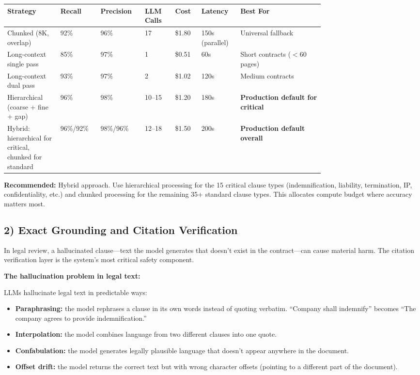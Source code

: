 \begin{tabular}{|p{0.14\linewidth}|p{0.08\linewidth}|p{0.10\linewidth}|p{0.08\linewidth}|p{0.06\linewidth}|p{0.08\linewidth}|p{0.22\linewidth}|}
\hline
\textbf{Strategy} & \textbf{Recall} & \textbf{Precision} & \textbf{LLM Calls} & \textbf{Cost} & \textbf{Latency} & \textbf{Best For} \\
\hline
Chunked (8K, overlap) & 92\% & 96\% & 17 & \$1.80 & 150s (parallel) & Universal fallback \\
\hline
Long-context single pass & 85\% & 97\% & 1 & \$0.51 & 60s & Short contracts ($<$60 pages) \\
\hline
Long-context dual pass & 93\% & 97\% & 2 & \$1.02 & 120s & Medium contracts \\
\hline
Hierarchical (coarse + fine + gap) & 96\% & 98\% & 10--15 & \$1.20 & 180s & \textbf{Production default for critical} \\
\hline
Hybrid: hierarchical for critical, chunked for standard & 96\%/92\% & 98\%/96\% & 12--18 & \$1.50 & 200s & \textbf{Production default overall} \\
\hline
\end{tabular}

\textbf{Recommended:} Hybrid approach. Use hierarchical processing for the 15 critical clause types (indemnification, liability, termination, IP, confidentiality, etc.) and chunked processing for the remaining 35+ standard clause types. This allocates compute budget where accuracy matters most.

\subsection*{2) Exact Grounding and Citation Verification}

In legal review, a hallucinated clause---text the model generates that doesn't exist in the contract---can cause material harm. The citation verification layer is the system's most critical safety component.

\textbf{The hallucination problem in legal text:}

LLMs hallucinate legal text in predictable ways:
\begin{itemize}
  \item \textbf{Paraphrasing:} the model rephrases a clause in its own words instead of quoting verbatim. ``Company shall indemnify'' becomes ``The company agrees to provide indemnification.''
  \item \textbf{Interpolation:} the model combines language from two different clauses into one quote.
  \item \textbf{Confabulation:} the model generates legally plausible language that doesn't appear anywhere in the document.
  \item \textbf{Offset drift:} the model returns the correct text but with wrong character offsets (pointing to a different part of the document).
\end{itemize}

